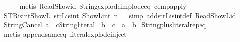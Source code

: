 \begin{isabellebody}
\ \ \ \ \isamarkupfalse%
\ {\isacharparenleft}{\kern0pt}metis\ Read{\isacharunderscore}{\kern0pt}Show{\isacharunderscore}{\kern0pt}id\ String{\isachardot}{\kern0pt}explode{\isacharunderscore}{\kern0pt}implode{\isacharunderscore}{\kern0pt}eq\ comp{\isacharunderscore}{\kern0pt}apply{\isacharparenright}{\kern0pt}\isanewline
{}\isamarkupfalse%
%
\endisatagproof
{\isafoldproof}%
%
\isadelimproof
\ \isanewline
%
\endisadelimproof
\isanewline
{}\isamarkupfalse%
\ STR{\isacharunderscore}{\kern0pt}is{\isacharunderscore}{\kern0pt}int{\isacharunderscore}{\kern0pt}ShowL{\isacharcolon}{\kern0pt}\ {\isacartoucheopen}strL{\isacharunderscore}{\kern0pt}is{\isacharunderscore}{\kern0pt}int{\isacharprime}{\kern0pt}\ {\isacharparenleft}{\kern0pt}ShowL\isactrlsub i\isactrlsub n\isactrlsub t\ n{\isacharparenright}{\kern0pt}{\isacartoucheclose}\isanewline
%
\isadelimproof
\ \ %
\endisadelimproof
%
\isatagproof
{}\isamarkupfalse%
{\isacharparenleft}{\kern0pt}simp\ add{\isacharcolon}{\kern0pt}strL{\isacharunderscore}{\kern0pt}is{\isacharunderscore}{\kern0pt}int{\isacharprime}{\kern0pt}{\isacharunderscore}{\kern0pt}def\ Read{\isacharunderscore}{\kern0pt}ShowL{\isacharunderscore}{\kern0pt}id{\isacharparenright}{\kern0pt}%
\endisatagproof
{\isafoldproof}%
%
\isadelimproof
\isanewline
%
\endisadelimproof
\isanewline
{}\isamarkupfalse%
\ String{\isacharunderscore}{\kern0pt}Cancel{\isacharcolon}{\kern0pt}\ {\isachardoublequoteopen}a\ {\isacharplus}{\kern0pt}\ {\isacharparenleft}{\kern0pt}c{\isacharcolon}{\kern0pt}{\isacharcolon}{\kern0pt}String{\isachardot}{\kern0pt}literal{\isacharparenright}{\kern0pt}\ {\isacharequal}{\kern0pt}\ b\ {\isacharplus}{\kern0pt}\ c\ {\isasymLongrightarrow}\ a\ {\isacharequal}{\kern0pt}\ b{\isachardoublequoteclose}\isanewline
%
\isadelimproof
%
\endisadelimproof
%
\isatagproof
{}\isamarkupfalse%
\ String{\isachardot}{\kern0pt}plus{\isacharunderscore}{\kern0pt}literal{\isachardot}{\kern0pt}rep{\isacharunderscore}{\kern0pt}eq\isanewline
\ \ \isamarkupfalse%
\ {\isacharparenleft}{\kern0pt}metis\ append{\isacharunderscore}{\kern0pt}same{\isacharunderscore}{\kern0pt}eq\ literal{\isachardot}{\kern0pt}explode{\isacharunderscore}{\kern0pt}inject{\isacharparenright}{\kern0pt}%
\endisatagproof
{\isafoldproof}%
%
\isadelimproof
\isanewline
%
\endisadelimproof
\isanewline
%
\isadelimtheory
\isanewline
%
\endisadelimtheory
%
\isatagtheory
{}\isamarkupfalse%
%
\endisatagtheory
{\isafoldtheory}%
%
\isadelimtheory
%
\endisadelimtheory
%
\end{isabellebody}%
